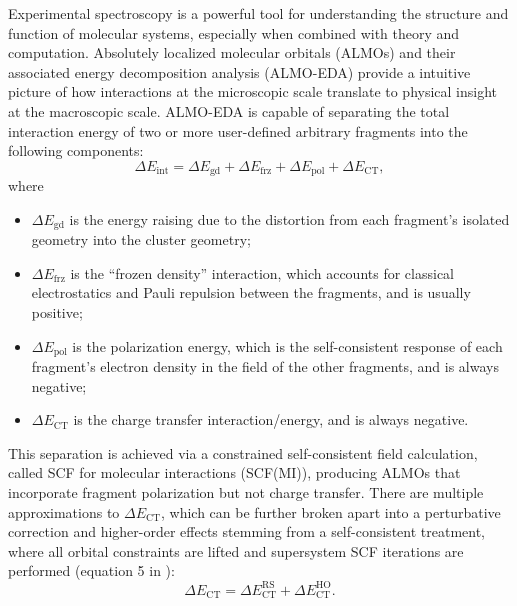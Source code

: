 \documentclass[%
  class = book,%
  crop = false,%
  float = true,%
  multi = true,%
  preview = false,%
]{standalone}
\begin{document}
Experimental spectroscopy is a powerful tool for understanding the structure and function of molecular systems, especially when combined with theory and computation\cite{AUTSCHBACH200383,NEESE2009526,doi:10.1021/cr2002239}. Absolutely localized molecular orbitals (ALMOs)\cite{Khaliullin2006} and their associated energy decomposition analysis (ALMO-EDA)\cite{Khaliullin2007} provide a intuitive picture of how interactions at the microscopic scale translate to physical insight at the macroscopic scale. ALMO-EDA is capable of separating the total interaction energy of two or more user-defined arbitrary fragments into the following components:
\begin{equation}
  \label{eq:almo-eda}
  \Delta E_{\text{int}} = \Delta E_{\text{gd}} + \Delta E_{\text{frz}} + \Delta E_{\text{pol}} + \Delta E_{\text{CT}},
\end{equation}
where
\begin{itemize}
\item \(\Delta E_{\text{gd}}\) is the energy raising due to the distortion from each fragment's isolated geometry into the cluster geometry;
\item \(\Delta E_{\text{frz}}\) is the ``frozen density'' interaction, which accounts for classical electrostatics and Pauli repulsion between the fragments, and is usually positive;
\item \(\Delta E_{\text{pol}}\) is the polarization energy, which is the self-consistent response of each fragment's electron density in the field of the other fragments, and is always negative;
\item \(\Delta E_{\text{CT}}\) is the charge transfer interaction/energy, and is always negative.
\end{itemize}

This separation is achieved via a constrained self-consistent field calculation, called SCF for molecular interactions (SCF(MI)), producing ALMOs that incorporate fragment polarization but not charge transfer. There are multiple approximations to \(\Delta E_{\text{CT}}\), which can be further broken apart into a perturbative correction and higher-order effects stemming from a self-consistent treatment, where all orbital constraints are lifted and supersystem SCF iterations are performed (equation 5 in ):
\begin{equation}
  \label{eq:almo-eda-ct}
  \Delta E_{\text{CT}} = \Delta E_{\text{CT}}^{\text{RS}} + \Delta E_{\text{CT}}^{\text{HO}}.
\end{equation}
\end{document}
